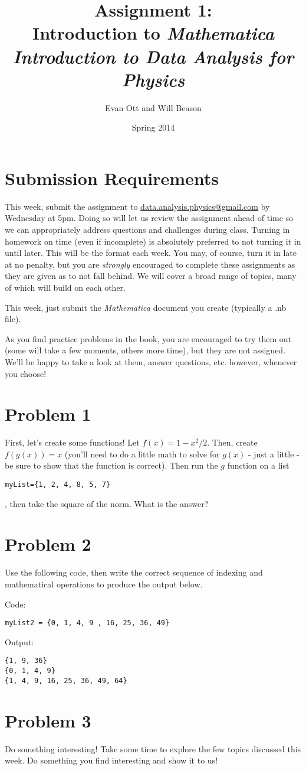 \documentclass{article}
\title{Assignment 1: \\ Introduction to \emph{Mathematica}\\
\large \emph{Introduction to Data Analysis for Physics}}
\author{Evan Ott and Will Beason}
\date{Spring 2014}
\begin{document}
\maketitle
\section{Submission Requirements}
This week, submit the assignment to \href{mailto:data.analysis.physics@gmail.com}{data.analysis.physics@gmail.com} by Wednesday at 5pm. Doing so will let
us review the assignment ahead of time so we can appropriately address questions and challenges during class. Turning in homework on time (even if incomplete) is absolutely
preferred to not turning it in until later. This will be the format each week. You may, of course,
turn it in late at no penalty, but you are \emph{strongly} encouraged to complete these assignments as they are given as to not fall behind. We will cover a broad
range of topics, many of which will build on each other.

This week, just submit the \emph{Mathematica} document you create (typically a .nb file).

As you find practice problems in the book, you are encouraged to try them out (some will take a few moments, others more time), but they are not assigned. We'll
be happy to take a look at them, answer questions, etc. however, whenever you choose!
\section{Problem 1}
First, let's create some functions! Let $f(x)=1-x^2/2$. Then, create $f(g(x))=x$ (you'll need to do a little math to solve for $g(x)$ - just a little - be sure to show that the function is correct).
Then run the $g$ function on a list \begin{verbatim}myList={1, 2, 4, 8, 5, 7}\end{verbatim}, then take the square of the norm. What is the answer?
\section{Problem 2}
Use the following code, then write the correct sequence of indexing and mathematical operations to produce the output below.

Code:
\begin{verbatim}
myList2 = {0, 1, 4, 9 , 16, 25, 36, 49}
\end{verbatim}

Output:
\begin{verbatim}
{1, 9, 36}
{0, 1, 4, 9}
{1, 4, 9, 16, 25, 36, 49, 64}
\end{verbatim}
\section{Problem 3}
Do something interesting! Take some time to explore the few topics discussed this week. Do something you find interesting and show it to us!
\end{document}
